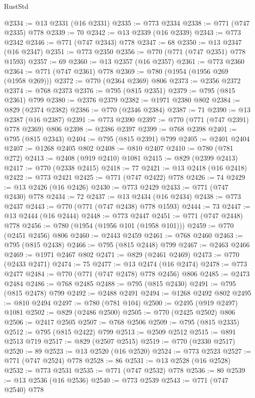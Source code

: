 \begin{lexlean}{RustStd}
\begin{coremodule}
{\begin{coremodule}
{{{{{{{{{{{{{{{@2334 := @13 @2331 (@16 @2331)
@2335 := @773 @2334
@2338 := @771 (@747 @2335) @778
@2339 := 70
@2342 := @13 @2339 (@16 @2339)
@2343 := @773 @2342
@2346 := @771 (@747 @2343) @778
@2347 := 68
@2350 := @13 @2347 (@16 @2347)
@2351 := @773 @2350
@2356 := @770 (@771 (@747 @2351) @778 @1593)
@2357 := 69
@2360 := @13 @2357 (@16 @2357)
@2361 := @773 @2360
@2364 := @771 (@747 @2361) @778
@2369 := @780 (@1954 (@1956 @269 (@1958 @269)))
@2372 := @770 (@2364 @2369) @806
@2373 := @2356 @2372
@2374 := @768 @2373
@2376 := @795 (@815 @2351)
@2379 := @795 (@815 @2361) @799
@2380 := @2376 @2379
@2382 := @1971 @2380 @802
@2384 := @829 (@2374 @2382)
@2386 := @770 (@2346 @2384)
@2387 := 71
@2390 := @13 @2387 (@16 @2387)
@2391 := @773 @2390
@2397 := @770 (@771 (@747 @2391) @778 @2369) @806
@2398 := @2386 @2397
@2399 := @768 @2398
@2401 := @795 (@815 @2343)
@2404 := @795 (@815 @2391) @799
@2405 := @2401 @2404
@2407 := @1268 @2405 @802
@2408 := @810 @2407
@2410 := @780 (@781 @272)
@2413 := @2408 (@919 @2410) @1081
@2415 := @829 (@2399 @2413)
@2417 := @770 (@2338 @2415)
@2418 := 77
@2421 := @13 @2418 (@16 @2418)
@2422 := @773 @2421
@2425 := @771 (@747 @2422) @778
@2426 := 74
@2429 := @13 @2426 (@16 @2426)
@2430 := @773 @2429
@2433 := @771 (@747 @2430) @778
@2434 := 72
@2437 := @13 @2434 (@16 @2434)
@2438 := @773 @2437
@2443 := @770 (@771 (@747 @2438) @778 @1593)
@2444 := 73
@2447 := @13 @2444 (@16 @2444)
@2448 := @773 @2447
@2451 := @771 (@747 @2448) @778
@2456 := @780 (@1954 (@1956 @101 (@1958 @101)))
@2459 := @770 (@2451 @2456) @806
@2460 := @2443 @2459
@2461 := @768 @2460
@2463 := @795 (@815 @2438)
@2466 := @795 (@815 @2448) @799
@2467 := @2463 @2466
@2469 := @1971 @2467 @802
@2471 := @829 (@2461 @2469)
@2473 := @770 (@2433 @2471)
@2474 := 75
@2477 := @13 @2474 (@16 @2474)
@2478 := @773 @2477
@2484 := @770 (@771 (@747 @2478) @778 @2456) @806
@2485 := @2473 @2484
@2486 := @768 @2485
@2488 := @795 (@815 @2430)
@2491 := @795 (@815 @2478) @799
@2492 := @2488 @2491
@2494 := @1268 @2492 @802
@2495 := @810 @2494
@2497 := @780 (@781 @104)
@2500 := @2495 (@919 @2497) @1081
@2502 := @829 (@2486 @2500)
@2505 := @770 (@2425 @2502) @806
@2506 := @2417 @2505
@2507 := @768 @2506
@2509 := @795 (@815 @2335)
@2512 := @795 (@815 @2422) @799
@2513 := @2509 @2512
@2515 := @891 @2513 @719
@2517 := @829 (@2507 @2515)
@2519 := @770 (@2330 @2517)
@2520 := 89
@2523 := @13 @2520 (@16 @2520)
@2524 := @773 @2523
@2527 := @771 (@747 @2524) @778
@2528 := 86
@2531 := @13 @2528 (@16 @2528)
@2532 := @773 @2531
@2535 := @771 (@747 @2532) @778
@2536 := 80
@2539 := @13 @2536 (@16 @2536)
@2540 := @773 @2539
@2543 := @771 (@747 @2540) @778
}}}}}}}}}}}}}}}
\end{coremodule}}
\end{coremodule}
\end{lexlean}

